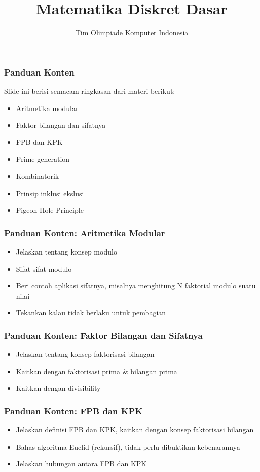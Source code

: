 

\title{Matematika Diskret Dasar}
\author{Tim Olimpiade Komputer Indonesia}
\date{}



\begin{frame}
\titlepage
\end{frame}

\begin{frame}
\frametitle{Panduan Konten}
Slide ini berisi semacam ringkasan dari materi berikut:
\begin{itemize}
  \item Aritmetika modular
  \item Faktor bilangan dan sifatnya
  \item FPB dan KPK
  \item Prime generation
  \item Kombinatorik
  \item Prinsip inklusi ekslusi
  \item Pigeon Hole Principle
\end{itemize}
\end{frame}

\begin{frame}
\frametitle{Panduan Konten: Aritmetika Modular}
\begin{itemize}
  \item Jelaskan tentang konsep modulo
  \item Sifat-sifat modulo
  \item Beri contoh aplikasi sifatnya, misalnya menghitung N faktorial modulo suatu nilai
  \item Tekankan kalau tidak berlaku untuk pembagian
\end{itemize}
\end{frame}

\begin{frame}
\frametitle{Panduan Konten: Faktor Bilangan dan Sifatnya}
\begin{itemize}
  \item Jelaskan tentang konsep faktorisasi bilangan
  \item Kaitkan dengan faktorisasi prima \& bilangan prima
  \item Kaitkan dengan divisibility
\end{itemize}
\end{frame}

\begin{frame}
\frametitle{Panduan Konten: FPB dan KPK}
\begin{itemize}
  \item Jelaskan definisi FPB dan KPK, kaitkan dengan konsep faktorisasi bilangan
  \item Bahas algoritma Euclid (rekursif), tidak perlu dibuktikan kebenarannya
  \item Jelaskan hubungan antara FPB dan KPK
\end{itemize}
\end{frame}

